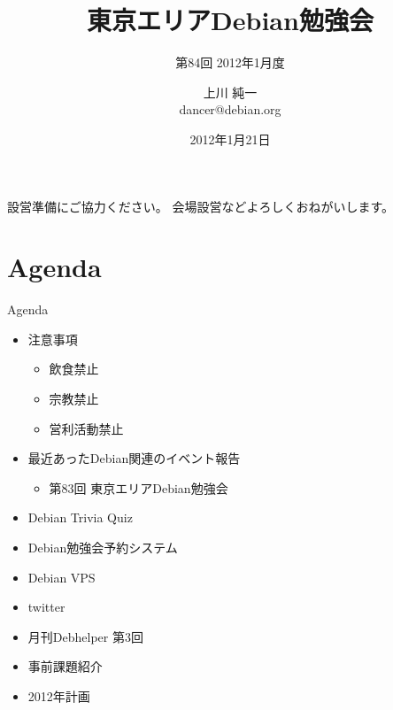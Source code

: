 \title{東京エリアDebian勉強会}
\subtitle{第84回 2012年1月度}
\author{上川 純一\\dancer@debian.org}
\date{2012年1月21日}



\frame{\titlepage{}}

\begin{frame}{設営準備にご協力ください。}
会場設営などよろしくおねがいします。
\end{frame}

\section{Agenda}
\begin{frame}{Agenda}
\begin{minipage}[t]{0.45\hsize}
  \begin{itemize}
  \item 注意事項
	\begin{itemize}
	 \item 飲食禁止
	 \item 宗教禁止
	 \item 営利活動禁止
	\end{itemize}
   \item 最近あったDebian関連のイベント報告
	\begin{itemize}
        \item 第83回 東京エリアDebian勉強会
	\end{itemize}
 \end{itemize}
\end{minipage} 
\begin{minipage}[t]{0.45\hsize}
 \begin{itemize}
   \item Debian Trivia Quiz
   \item Debian勉強会予約システム
   \item Debian VPS
   \item twitter
   \item 月刊Debhelper 第3回
   \item 事前課題紹介
   \item 2012年計画
  \end{itemize}
\end{minipage}
\end{frame}

